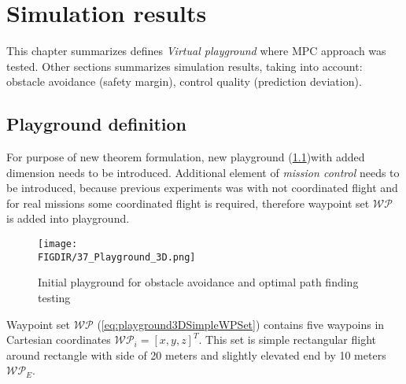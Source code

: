 \chapter{Simulation results}\label{ch:simulationResults}
\noindent This chapter summarizes defines \textit{Virtual playground} where MPC approach was tested. Other sections summarizes simulation results, taking into account: obstacle avoidance (safety margin), control quality (prediction deviation).
\section{Playground definition}\label{ch:3DPlaygroundDefinition}
\noindent For purpose of new theorem formulation, new playground (\ref{fig:new3DPlayground})with added dimension needs to be introduced. Additional element of \textit{mission control} needs to be introduced, because previous experiments was with not coordinated flight and for real missions some coordinated flight is required, therefore waypoint set $\mathscr{WP}$ is added into playground. 
\begin{figure}[H]
    \centering
    \texttt{[image: \\FIGDIR/37\_Playground\_3D.png]}
    \caption{Initial playground for obstacle avoidance and optimal path finding testing}
    \label{fig:new3DPlayground}
\end{figure}
\newpage\noindent Waypoint set $\mathscr{WP}$ (\ref{eq:playground3DSimpleWPSet}) contains five waypoins in Cartesian coordinates $\mathscr{WP}_i =[x,y,z]^T$. This set is simple rectangular flight around rectangle with side of 20 meters and slightly elevated end by 10 meters $\mathscr{WP}_E$.

